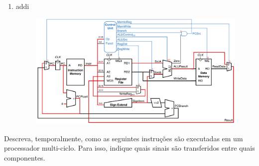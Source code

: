 \documentclass{article}
\begin{document}
\begin{enumerate}
    \item addi\\

\begin{figure}[H]
    \centering
    \includegraphics[width=1\linewidth]{addi.png}
\end{figure}

\end{enumerate}

{\large Descreva, temporalmente, como as seguintes instruções são executadas em um processador multi-ciclo. Para isso, indique quais sinais são transferidos entre quais componentes.}
\end{document}
